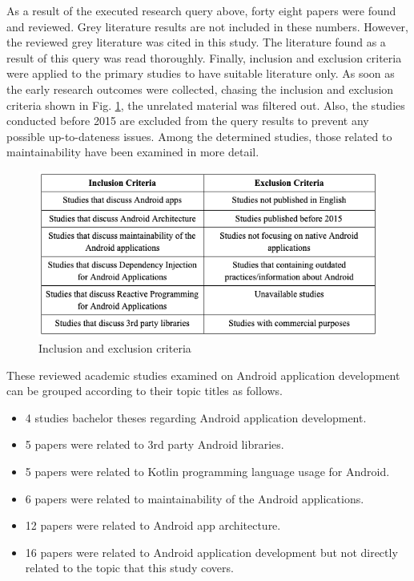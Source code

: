 As a result of the executed research query above, forty eight papers were found and reviewed. Grey literature results are not included in these numbers. However, the reviewed grey literature was cited in this study.  The literature found as a result of this query was read thoroughly. Finally, inclusion and exclusion criteria were applied to the primary studies to have suitable literature only. As soon as the early research outcomes were collected, chasing the inclusion and exclusion criteria shown in Fig. \ref{fig:lit_review_research_query_criteria}, the unrelated material was filtered out. Also, the studies conducted before 2015 are excluded from the query results to prevent any possible up-to-dateness issues. Among the determined studies, those related to maintainability have been examined in more detail. 
\begin{figure}[ht!]
    \centering
    \includegraphics[scale=0.6]{figures/research_query_criteria.png}
    \caption{Inclusion and exclusion criteria}
    \label{fig:lit_review_research_query_criteria}
\end{figure}

These reviewed academic studies examined on Android application development can be grouped according to their topic titles as follows.
\begin{itemize}
    \item 4 studies bachelor theses regarding Android application development.
    \item 5 papers were related to 3rd party Android libraries.
    \item 5 papers were related to Kotlin programming language usage for Android.
    \item 6 papers were related to maintainability of the Android applications.
    \item 12 papers were related to Android app architecture.
    \item 16 papers were related to Android application development but not directly related to the topic that this study covers.
\end{itemize}

